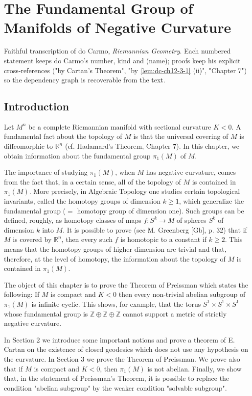 \chapter{The Fundamental Group of Manifolds of Negative Curvature}
\label{chap:dc-fundamental-group-negative-curvature}

Faithful transcription of do Carmo, \emph{Riemannian Geometry}. Each numbered
statement keeps do Carmo's number, kind and (name); proofs keep his explicit
cross-references ("by Cartan's Theorem", "by \cref{lem:dc-ch12-3-1} (ii)", "Chapter 7") so the
dependency graph is recoverable from the text.

\section{Introduction}

Let $M^n$ be a complete Riemannian manifold with sectional curvature $K<0$. A
fundamental fact about the topology of $M$ is that the universal covering of $M$
is diffeomorphic to $\mathbb{R}^n$ (cf. Hadamard's Theorem, Chapter 7). In this
chapter, we obtain information about the fundamental group $\pi_1(M)$ of $M$.

The importance of studying $\pi_1(M)$, when $M$ has negative curvature, comes
from the fact that, in a certain sense, all of the topology of $M$ is contained
in $\pi_1(M)$. More precisely, in Algebraic Topology one studies certain
topological invariants, called the homotopy groups of dimension $k\geq 1$, which
generalize the fundamental group ($=$ homotopy group of dimension one). Such
groups can be defined, roughly, as homotopy classes of maps $f:S^k\to M$ of
spheres $S^k$ of dimension $k$ into $M$. It is possible to prove (see M.
Greenberg [Gb], p. 32) that if $M$ is covered by $\mathbb{R}^n$, then every such
$f$ is homotopic to a constant if $k\geq 2$. This means that the homotopy groups
of higher dimension are trivial and that, therefore, at the level of homotopy,
the information about the topology of $M$ is contained in $\pi_1(M)$.

The object of this chapter is to prove the Theorem of Preissman which states the
following: If $M$ is compact and $K<0$ then every non-trivial abelian subgroup of
$\pi_1(M)$ is infinite cyclic. This shows, for example, that the torus
$S^1\times S^1\times S^1$ whose fundamental group is
$\mathbb{Z}\oplus\mathbb{Z}\oplus\mathbb{Z}$ cannot support a metric of strictly
negative curvature.

In Section 2 we introduce some important notions and prove a theorem of E. Cartan
on the existence of closed geodesics which does not use any hypothesis on the
curvature. In Section 3 we prove the Theorem of Preissman. We prove also that if
$M$ is compact and $K<0$, then $\pi_1(M)$ is not abelian. Finally, we show that,
in the statement of Preissman's Theorem, it is possible to replace the condition
"abelian subgroup" by the weaker condition "solvable subgroup".

